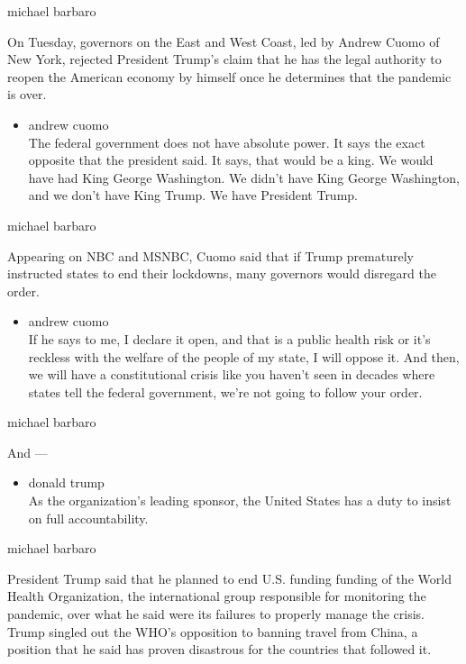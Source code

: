 michael barbaro

On Tuesday, governors on the East and West Coast, led by Andrew Cuomo of
New York, rejected President Trump's claim that he has the legal
authority to reopen the American economy by himself once he determines
that the pandemic is over.

\begin{itemize}
\tightlist
\item
  andrew cuomo\\
  The federal government does not have absolute power. It says the exact
  opposite that the president said. It says, that would be a king. We
  would have had King George Washington. We didn't have King George
  Washington, and we don't have King Trump. We have President Trump.
\end{itemize}

michael barbaro

Appearing on NBC and MSNBC, Cuomo said that if Trump prematurely
instructed states to end their lockdowns, many governors would disregard
the order.

\begin{itemize}
\tightlist
\item
  andrew cuomo\\
  If he says to me, I declare it open, and that is a public health risk
  or it's reckless with the welfare of the people of my state, I will
  oppose it. And then, we will have a constitutional crisis like you
  haven't seen in decades where states tell the federal government,
  we're not going to follow your order.
\end{itemize}

michael barbaro

And ---

\begin{itemize}
\tightlist
\item
  donald trump\\
  As the organization's leading sponsor, the United States has a duty to
  insist on full accountability.
\end{itemize}

michael barbaro

President Trump said that he planned to end U.S. funding funding of the
World Health Organization, the international group responsible for
monitoring the pandemic, over what he said were its failures to properly
manage the crisis. Trump singled out the WHO's opposition to banning
travel from China, a position that he said has proven disastrous for the
countries that followed it.

